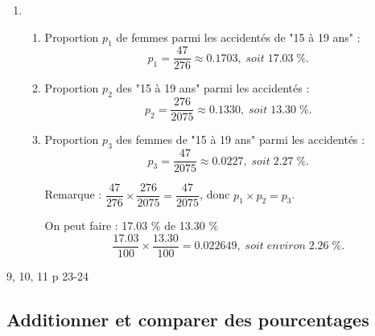 \documentclass[12pt,a4paper]{article}
\begin{document}
\begin{enumerate}[label=\arabic*. ]
	\medskip 
	
	\item \begin{enumerate}[label=\alph*)]
		\item Proportion $p_1$ de femmes parmi les accidentés de "15 à 19 ans" :
		\begin{equation*}
			p_1=\dfrac{47}{276}\approx \num{0.1703}, \; soit \; \num{17.03}\; \%.
		\end{equation*}
	
		\item Proportion $p_2$ des "15 à 19 ans" parmi les accidentés :
		\begin{equation*}
			p_2=\dfrac{276}{2075} \approx \num{0.1330}, \; soit \; \num{13.30}\; \%.
		\end{equation*}
		
		\item Proportion $p_3$ des femmes de "15 à 19 ans" parmi les accidentés :
		\begin{equation*}
			p_3 = \dfrac{47}{2075} \approx \num{0.0227}, \; soit \; \num{2.27} \; \%.
		\end{equation*}
		
		\begin{myrem}
			Remarque : $\dfrac{47}{276}  \times \dfrac{276}{2075} = \dfrac{47}{2075}$, donc $p_1 \times p_2 = p_3$.
			
			On peut faire : \num{17.03} \% de \num{13.30} \%
			\begin{equation*}
			\dfrac{\num{17.03}}{100} \times \dfrac{\num{13.30}}{100} = \num{0.022649}, \; soit \; environ \; \num{2.26}\; \%.
			\end{equation*}	
		\end{myrem}
		
	\end{enumerate}
\end{enumerate}

\begin{myexos}
	9, 10, 11 p 23-24
\end{myexos}

\newpage

\subsection{Additionner et comparer des pourcentages}
\end{document}
